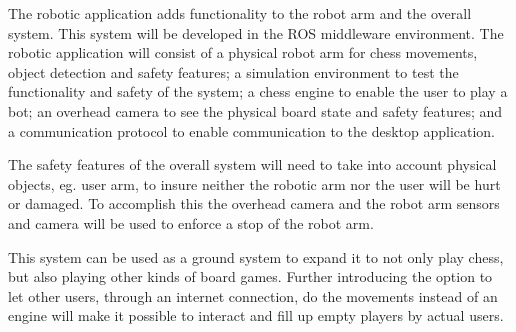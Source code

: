 \documentclass[11pt,fleqn,twoside]{article}
\begin{document}
\noindent The robotic application adds functionality to the robot arm and the overall system. This system will be 
developed in the ROS middleware environment\cite{ros}. The robotic application will consist of a physical robot arm for chess
movements, object detection and safety features; a simulation environment to test the functionality and safety of the 
system; a chess engine to enable the user to play a bot; an overhead camera to see the physical board state and safety 
features; and a communication protocol to enable communication to the desktop application.\newline 

\noindent The safety features of the overall system will need to take into account physical objects, eg. user arm,
to insure neither the robotic arm nor the user will be hurt or damaged. To accomplish this the overhead camera and 
the robot arm sensors and camera will be used to enforce a stop of the robot arm.\newline

\noindent This system can be used as a ground system to expand it to not only play chess, but also playing other 
kinds of board games. Further introducing the option to let other users, through an internet connection, do the 
movements instead of an engine will make it possible to interact and fill up empty players by actual users.\newline

\end{document}
